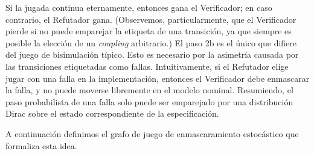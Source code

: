 Si la jugada continua eternamente, entonces gana el Verificador; en caso contrario, el Refutador gana. (Observemos, particularmente, que el Verificador pierde si no puede emparejar la etiqueta de una transición, ya que siempre es posible la elección de un \textit{coupling} arbitrario.)  El paso 2b es el único que difiere del juego de bisimulación típico.  Esto es necesario por la asimetría causada por las transiciones etiquetadas como fallas. Intuitivamente,  si el Refutador elige jugar con una falla en la implementación, entonces el Verificador debe enmascarar la falla, y no puede moverse libremente en el modelo nominal.  Resumiendo, el paso probabilista de una falla solo puede ser emparejado por una distribución Dirac sobre el estado correspondiente de la especificación.

A continuación definimos el grafo de juego de enmascaramiento estocástico que formaliza esta idea.

